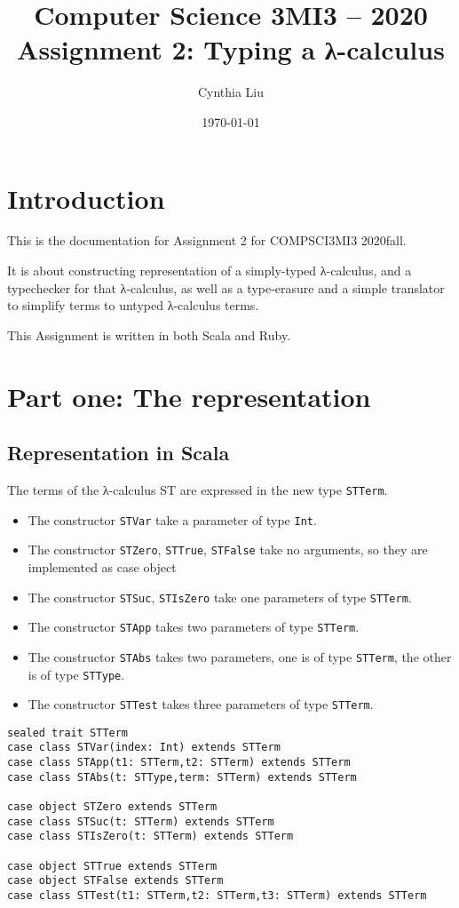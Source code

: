 \documentclass[11pt]{article}
\author{Cynthia Liu}
\date{\today}
\title{Computer Science 3MI3 – 2020 Assignment 2: Typing a λ-calculus}
\begin{document}
\maketitle
\tableofcontents


\section{Introduction}
\label{sec:org4a04684}
This is the documentation for Assignment 2 for COMPSCI3MI3 2020fall. 

It is about constructing representation of a simply-typed λ-calculus, 
and a typechecker for that λ-calculus, as well as a type-erasure and a simple translator to simplify terms to untyped λ-calculus terms.

This Assignment is written in both Scala and Ruby. 

\section{Part one: The representation}
\label{sec:org5c2a176}
\subsection{Representation in Scala}
\label{sec:org768944a}
The terms of the λ-calculus ST are expressed in the new type \texttt{STTerm}.
\begin{itemize}
\item The constructor \texttt{STVar} take a parameter of type \texttt{Int}.
\item The constructor \texttt{STZero}, \texttt{STTrue}, \texttt{STFalse} take no arguments, so they are implemented as case object
\item The constructor \texttt{STSuc}, \texttt{STIsZero} take one parameters of type \texttt{STTerm}.
\item The constructor \texttt{STApp} takes two parameters of type \texttt{STTerm}.
\item The constructor \texttt{STAbs} takes two parameters, one is of type \texttt{STTerm}, the other is of type \texttt{STType}.
\item The constructor \texttt{STTest} takes three parameters of type \texttt{STTerm}.
\end{itemize}


\begin{verbatim}
sealed trait STTerm
case class STVar(index: Int) extends STTerm
case class STApp(t1: STTerm,t2: STTerm) extends STTerm
case class STAbs(t: STType,term: STTerm) extends STTerm

case object STZero extends STTerm
case class STSuc(t: STTerm) extends STTerm
case class STIsZero(t: STTerm) extends STTerm

case object STTrue extends STTerm
case object STFalse extends STTerm
case class STTest(t1: STTerm,t2: STTerm,t3: STTerm) extends STTerm

\end{verbatim}
\end{document}
